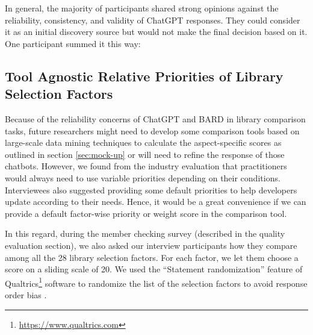  In general, the majority of participants shared strong opinions against the reliability, consistency, and validity of ChatGPT responses. They could consider it as an initial discovery source but would not make the final decision based on it. One participant summed it this way: 

 
\subsection{Tool Agnostic Relative Priorities of Library Selection Factors}
Because of the reliability concerns of ChatGPT and BARD in library comparison tasks, future researchers might need to develop some comparison tools based on large-scale data mining techniques to calculate the aspect-specific scores as outlined in section \ref{sec:mock-up} or will need to refine the response of those chatbots. However, we found from the industry evaluation that practitioners would always need to use variable priorities depending on their conditions. Interviewees also suggested providing some default priorities to help developers update according to their needs. Hence,
it would be a great convenience if we can provide a default factor-wise priority or weight score in the comparison tool.



In this regard, during the member checking survey (described in the quality evaluation section), we also asked our interview participants how they compare among all the 28 library selection factors. For each factor, we let them choose a score on a sliding scale of 20. We used the ``Statement randomization'' feature of Qualtrics\footnote{\url{https://www.qualtrics.com}} software to randomize the list of the selection factors to avoid response order bias \cite{israel1990can}.

